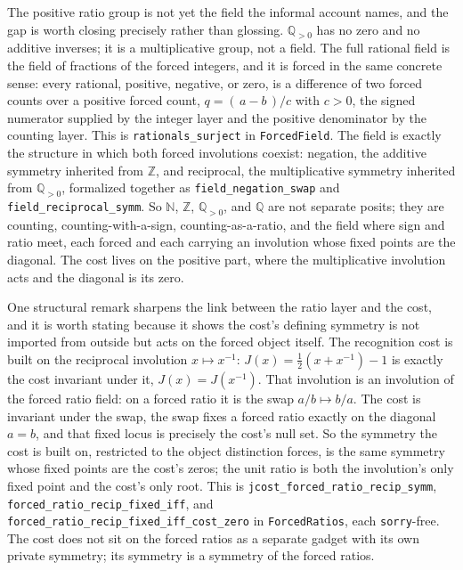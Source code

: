 \documentclass[11pt,a4paper]{article}
\theoremstyle{definition}
\theoremstyle{remark}
\begin{document}
The positive ratio group is not yet the field the informal account names, and the
gap is worth closing precisely rather than glossing. $\mathbb{Q}_{>0}$ has no zero
and no additive inverses; it is a multiplicative group, not a field. The full
rational field is the field of fractions of the forced integers, and it is forced
in the same concrete sense: every rational, positive, negative, or zero, is a
difference of two forced counts over a positive forced count,
$q=(\,a-b\,)/c$ with $c>0$, the signed numerator supplied by the integer layer and
the positive denominator by the counting layer. This is
\texttt{rationals\_surject} in \texttt{ForcedField}. The field is exactly the
structure in which both forced involutions coexist: negation, the additive
symmetry inherited from $\mathbb{Z}$, and reciprocal, the multiplicative symmetry
inherited from $\mathbb{Q}_{>0}$, formalized together as
\texttt{field\_negation\_swap} and \texttt{field\_reciprocal\_symm}. So
$\mathbb{N}$, $\mathbb{Z}$, $\mathbb{Q}_{>0}$, and $\mathbb{Q}$ are not separate
posits; they are counting, counting-with-a-sign, counting-as-a-ratio, and the
field where sign and ratio meet, each forced and each carrying an involution whose
fixed points are the diagonal. The cost lives on the positive part, where the
multiplicative involution acts and the diagonal is its zero.

One structural remark sharpens the link between the ratio layer and the cost,
and it is worth stating because it shows the cost's defining symmetry is not
imported from outside but acts on the forced object itself. The recognition cost
is built on the reciprocal involution $x\mapsto x^{-1}$: $J(x)=\tfrac12(x+x^{-1})-1$
is exactly the cost invariant under it, $J(x)=J(x^{-1})$. That involution is an
involution of the forced ratio field: on a forced ratio it is the swap
$a/b\mapsto b/a$. The cost is invariant under the swap, the swap fixes a forced
ratio exactly on the diagonal $a=b$, and that fixed locus is precisely the cost's
null set. So the symmetry the cost is built on, restricted to the object
distinction forces, is the same symmetry whose fixed points are the cost's zeros;
the unit ratio is both the involution's only fixed point and the cost's only
root. This is \texttt{jcost\_forced\_ratio\_recip\_symm},
\texttt{forced\_ratio\_recip\_fixed\_iff}, and
\texttt{forced\_ratio\_recip\_fixed\_iff\_cost\_zero} in \texttt{ForcedRatios},
each \texttt{sorry}-free. The cost does not sit on the forced ratios as a separate
gadget with its own private symmetry; its symmetry is a symmetry of the forced
ratios.
\end{document}
